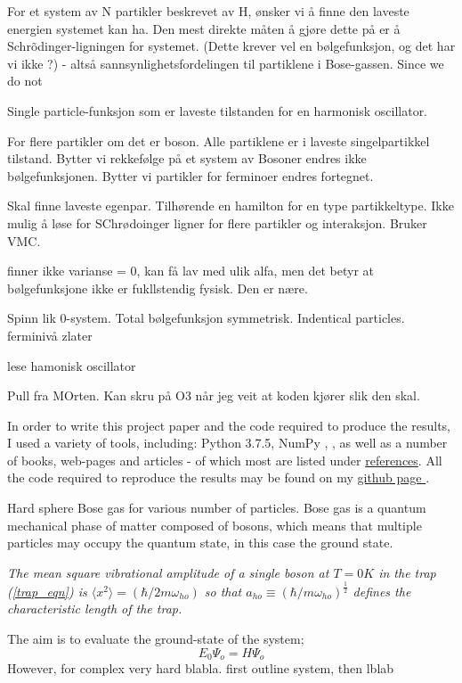 \documentclass[%
oneside,                 %
final,                   %
10pt]{article}
\begin{document}
For et system av N partikler beskrevet av H, ønsker vi å finne den laveste energien systemet kan ha. Den mest direkte måten å gjøre dette på er å Schrõdinger-ligningen for systemet. (Dette krever
vel en bølgefunksjon, og det har vi ikke ?) - altså sannsynlighetsfordelingen til partiklene i Bose-gassen. Since we do not 

Single particle-funksjon som er laveste tilstanden for en harmonisk oscillator.

For flere partikler om det er boson. Alle partiklene er i laveste singelpartikkel tilstand. Bytter vi rekkefølge på et system av Bosoner endres ikke bølgefunksjonen. Bytter vi partikler for ferminoer endres fortegnet. 

Skal finne laveste egenpar.  Tilhørende en hamilton for en type partikkeltype. Ikke mulig å løse for SChrødoinger ligner for flere partikler og interaksjon. Bruker VMC. 

finner ikke varianse = 0, kan få lav med ulik alfa, men det betyr at bølgefunksjone ikke er fukllstendig fysisk. Den er nære. 

Spinn lik 0-system. Total bølgefunksjon symmetrisk. Indentical particles. ferminivå zlater

lese hamonisk oscillator

Pull fra MOrten. Kan skru på O3 når jeg veit at koden kjører slik den skal.


In order to write this project paper and the code required to produce the results, I used a variety of tools, including: Python 3.7.5, NumPy \cite{numpy}, , as well as a number of books, web-pages and articles - of which most are listed under 
 \hyperref[refer]{references}. All the code required to reproduce the results may be found on my \href{https://github.com/johanere/FYS-STK4155/tree/master/Project3}{github page }.  


Hard sphere Bose gas for various number of particles. Bose gas is a quantum mechanical phase of matter composed of bosons, which means that multiple particles may occupy the quantum state, in this case the ground state.

\textit{The mean square vibrational amplitude of a single boson at $T=0K$ in the trap (\ref{trap_eqn}) is
 $\langle x^2\rangle=(\hbar/2m\omega_{ho})$ so that $a_{ho} \equiv
 (\hbar/m\omega_{ho})^{\frac{1}{2}}$ defines the characteristic length
 of the trap. }
 
The aim is to evaluate the ground-state of the system;
\begin{equation*}
E_0 \Psi_o = H \Psi_o
\end{equation*}
 However, for complex very hard blabla. first outline system, then lblab
 
\end{document}
